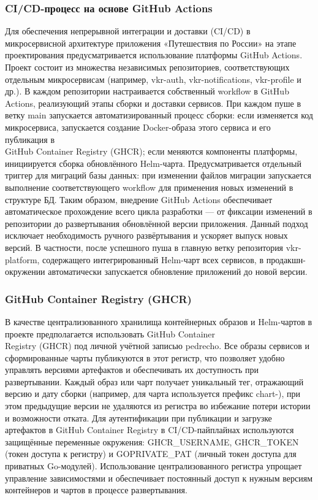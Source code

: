 \subsubsection*{CI/CD-процесс на основе GitHub Actions}
Для обеспечения непрерывной интеграции и доставки (CI/CD) в микросервисной архитектуре приложения «Путешествия по России» на этапе проектирования предусматривается использование платформы GitHub Actions. Проект состоит из множества независимых репозиториев, соответствующих отдельным микросервисам (например, vkr-auth, vkr-notifications, vkr-profile и др.). В каждом репозитории настраивается собственный workflow в GitHub Actions, реализующий этапы сборки и доставки сервисов. При каждом пуше в ветку main запускается автоматизированный процесс сборки: если изменяется код микросервиса, запускается создание Docker-образа этого сервиса и его публикация в \\ GitHub Container Registry (GHCR); если меняются компоненты платформы, инициируется сборка обновлённого Helm-чарта. Предусматривается отдельный триггер для миграций базы данных: при изменении файлов миграции запускается выполнение соответствующего workflow для применения новых изменений в структуре БД.
Таким образом, внедрение GitHub Actions обеспечивает автоматическое прохождение всего цикла разработки — от фиксации изменений в репозитории до развертывания обновлённой версии приложения. Данный подход исключает необходимость ручного развёртывания и ускоряет выпуск новых версий. В частности, после успешного пуша в главную ветку репозитория vkr-platform, содержащего интегрированный Helm-чарт всех сервисов, в продакшн-окружении автоматически запускается обновление приложений до новой версии.

\subsubsection*{GitHub Container Registry (GHCR)}
В качестве централизованного хранилища контейнерных образов и Helm-чартов в проекте предполагается использовать GitHub Container \\ Registry (GHCR) под личной учётной записью pedrecho. Все образы сервисов и сформированные чарты публикуются в этот регистр, что позволяет удобно управлять версиями артефактов и обеспечивать их доступность при развертывании.
Каждый образ или чарт получает уникальный тег, отражающий версию и дату сборки (например, для чарта используется префикс chart-), при этом предыдущие версии не удаляются из регистра во избежание потери истории и возможности отката. Для аутентификации при публикации и загрузке артефактов в GitHub Container Registry в CI/CD-пайплайнах используются защищённые переменные окружения: GHCR\_USERNAME, GHCR\_TOKEN (токен доступа к регистру) и GOPRIVATE\_PAT (личный токен доступа для приватных Go-модулей). Использование централизованного регистра упрощает управление зависимостями и обеспечивает постоянный доступ к нужным версиям контейнеров и чартов в процессе развертывания.

